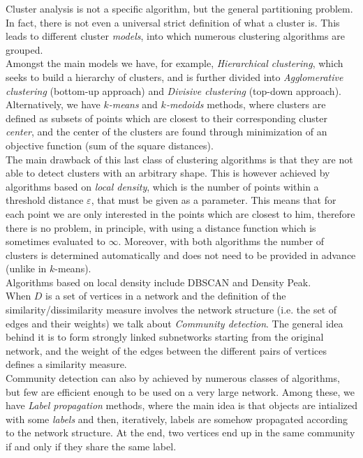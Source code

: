 \documentclass[a4paper,11pt]{book}
\begin{document}
Cluster analysis is not a specific algorithm, but the general partitioning problem. In fact, there is not even a universal strict definition of what a cluster is. This leads to different cluster \textit{models}, into which numerous clustering algorithms are grouped.\\
Amongst the main models we have, for example, \textit{Hierarchical clustering}\cite{hie}, which seeks to build a hierarchy of clusters, and is further divided into \textit{Agglomerative clustering} (bottom-up approach) and \textit{Divisive clustering} (top-down approach).\\
Alternatively, we have $k$\textit{-means} and $k$\textit{-medoids} methods, where clusters are defined as subsets of points which are closest to their corresponding cluster \textit{center}, and the center of the clusters are found through minimization of an objective function (sum of the square distances).\\
The main drawback of this last class of clustering algorithms is that they are not able to detect clusters with an arbitrary shape. This is however achieved by algorithms based on \textit{local density}, which is the number of points within a threshold distance $\varepsilon$, that must be given as a parameter. This means that for each point we are only interested in the points which
are closest to him, therefore there is no problem, in principle, with using a distance function which is sometimes evaluated to $\infty$. Moreover, with both algorithms the number of clusters is determined automatically and does not need to be provided in advance (unlike in $k$-means).\\
Algorithms based on local density include DBSCAN\cite{db} and Density Peak\cite{dp}.\\

When $D$ is a set of vertices in a network and the definition of the similarity/dissimilarity measure involves the network structure (i.e. the set of edges and their weights) we talk about \textit{Community detection}. The general idea behind it is to form strongly linked subnetworks starting from the original network, and the weight of the edges between the different pairs of vertices defines a similarity measure.\\
Community detection can also by achieved by numerous classes of algorithms\cite{commdet}, but few are efficient enough to be used on a very large network. Among these, we have \emph{Label propagation} methods, where the main idea is that objects are intialized with some \emph{labels} and then, iteratively, labels are somehow propagated according to the network structure. At the end, two vertices end up in the same community if and only if they share the same label.
\end{document}
